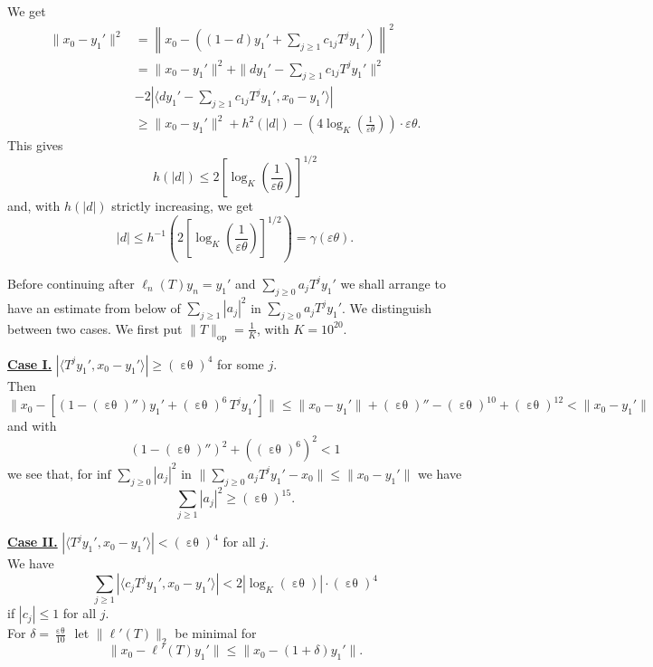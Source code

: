 \documentclass[12pt,oneside,reqno]{amsart}
\theoremstyle{definition}
\DeclareMathOperator*{\VE}{\varepsilon\theta}
\begin{document}
We get
\begin{align*}
	\|x_0 - y_1'\|^2 & = \left\| x_0 - \left(  (1-d)y_1' + \sum_{j\ge 1} c_{1 j} T^j y_1'  \right) \right\|^2 \\
	& = \|x_0 - y_1'\|^2 + \|d y_1' - \sum_{j\ge 1} c_{1 j} T^j y_1' \|^2\\
	& - 2 |\langle d y_1' - \sum_{j \ge 1} c_{1 j} T^j y_1', x_0  - y_1'\rangle | \\
	& \ge \|x_0 - y_1'\|^2 +h^2(|d|) - \left( 4 \log_K \left(\frac{1}{\varepsilon\theta}\right)\right) \cdot \varepsilon\theta .
\end{align*}
This gives
$$h(|d|) \le 2 \left[\log_K \left(\frac{1}{\varepsilon\theta}\right)\right]^{1/2} $$
and, with $h(|d|)$ strictly increasing, we get
$$|d| \le h^{-1} \left(  2 \left[\log_K \left(\frac{1}{\varepsilon\theta}\right)\right]^{1/2}  \right) = \gamma (\varepsilon \theta).$$

Before continuing after $\ell_n(T)y_n = y_1'$ and $\displaystyle \sum_{j \ge 0} a_j T^j y_1'$ we shall arrange to have an estimate from below of $\sum_{j \ge 1} |a_j|^2$ in $\sum_{j \ge 0} a_j T^j y_1'$. We distinguish between two cases. We first put $\|T\|_{\text{op}} = \frac{1}{K}$, with $K = 10^{20}$.

\bigskip

\noindent \textbf{\underline{Case I.}} $\displaystyle |\langle T^j y_1', x_0 - y_1'\rangle| \ge (\VE)^4$ for some $j$.\\ 
\noindent Then  $$\|x_0 - \left[ (1- (\VE)'') y_1' + (\VE)^6 \, T^j y_1' \right]\| \le \|x_0 - y_1'\| + (\VE)'' - (\VE)^{10} + (\VE)^{12} < \|x_0 - y_1'\|$$
and with
$$\left( 1- (\VE)''\right)^2 + \left( (\VE)^6 \right)^2 < 1$$
we see that, for $\text{inf } \sum_{j \ge 0} |a_j|^2$ in $\displaystyle \| \sum_{j \ge 0} a_j T^j y_1' - x_0\| \le  \|x_0 - y_1'\|$ we have 
\begin{equation}\label{eq25}
	 \sum_{j \ge 1} |a_j|^2 \ge (\VE)^{15}.
\end{equation}
\bigskip

\noindent \textbf{\underline{Case II.}} $\displaystyle |\langle T^j y_1', x_0 - y_1'\rangle| < (\VE)^4$ for all $j$.\\  
\noindent We have 
$$\sum_{j \ge 1} \left| \langle c_j T^j y_1', x_0 - y_1'\rangle\right| < 2 |\log_{K} (\VE)| \cdot (\VE)^4$$
if $|c_j| \le 1$ for all $j$.\\

For $\displaystyle \delta = \frac{\VE}{10}\,$ let $\|\ell' (T)\|_2$ be minimal for 
\begin{equation}\label{eq26}
	\|x_0 - \ell' (T) y_1'\| \le \|x_0 - (1 + \delta) y_1'\|.
\end{equation}
\end{document}
